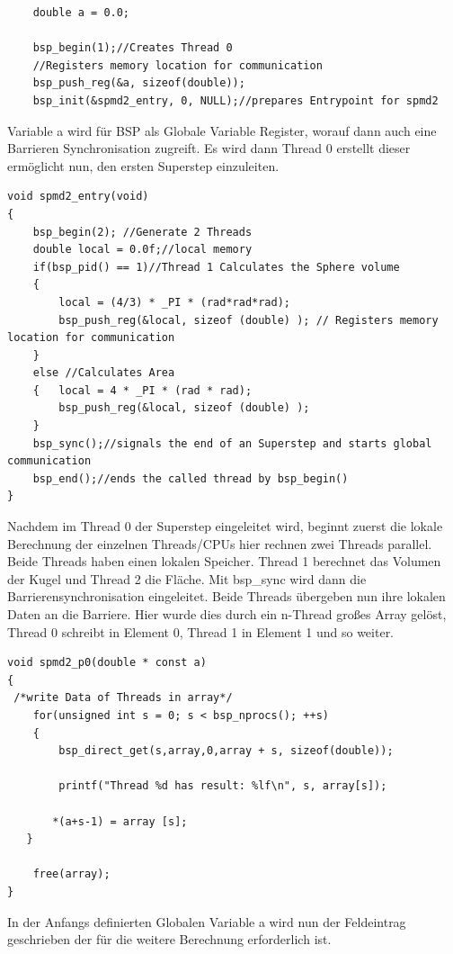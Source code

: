 \documentclass[a4paper,10pt]{scrartcl}
\begin{document}
\begin{lstlisting}
    double a = 0.0;
    
    bsp_begin(1);//Creates Thread 0  
    //Registers memory location for communication  
    bsp_push_reg(&a, sizeof(double));   
    bsp_init(&spmd2_entry, 0, NULL);//prepares Entrypoint for spmd2    
\end{lstlisting}
Variable a wird für BSP als Globale Variable Register, worauf dann auch eine Barrieren Synchronisation zugreift. Es wird dann Thread 0  erstellt dieser ermöglicht nun, den ersten Superstep einzuleiten.

\begin{lstlisting}
void spmd2_entry(void)
{    
    bsp_begin(2); //Generate 2 Threads
    double local = 0.0f;//local memory
    if(bsp_pid() == 1)//Thread 1 Calculates the Sphere volume
    {       
        local = (4/3) * _PI * (rad*rad*rad);
        bsp_push_reg(&local, sizeof (double) ); // Registers memory location for communication
    }    
    else //Calculates Area
    {   local = 4 * _PI * (rad * rad);
        bsp_push_reg(&local, sizeof (double) );
    }    
    bsp_sync();//signals the end of an Superstep and starts global communication
    bsp_end();//ends the called thread by bsp_begin()
} 

\end{lstlisting}
Nachdem im Thread 0 der Superstep eingeleitet wird, beginnt zuerst die lokale Berechnung der einzelnen Threads/CPUs hier rechnen zwei Threads parallel. Beide Threads haben einen lokalen Speicher. Thread 1 berechnet das Volumen der Kugel und Thread 2 die Fläche. Mit bsp\_sync wird dann die Barrierensynchronisation eingeleitet. Beide Threads übergeben nun ihre lokalen Daten an die Barriere. Hier wurde dies durch ein n-Thread großes Array gelöst, Thread 0 schreibt in Element 0, Thread 1 in Element 1 und so weiter.

\newpage

\begin{lstlisting}
void spmd2_p0(double * const a)
{
 /*write Data of Threads in array*/
    for(unsigned int s = 0; s < bsp_nprocs(); ++s)
    {
        bsp_direct_get(s,array,0,array + s, sizeof(double));
        
        printf("Thread %d has result: %lf\n", s, array[s]);
        
       *(a+s-1) = array [s]; 
   }
    
    free(array);
}
\end{lstlisting}
In der Anfangs definierten Globalen Variable a wird nun der Feldeintrag geschrieben der für die weitere Berechnung erforderlich ist.
\end{document}

